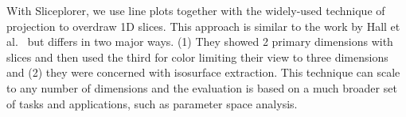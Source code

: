 With Sliceplorer, we use line plots together with the widely-used technique of
projection to overdraw 1D slices. This approach is similar to the work by Hall
et al.~\cite{Hall:2014} but differs in two major ways. (1) They showed 2
primary dimensions with slices and then used the third for color limiting their
view to three dimensions and (2) they were concerned with isosurface
extraction. This technique can scale to any number of dimensions and the
evaluation is based on a much broader set of tasks and applications, such as
parameter space analysis. 

